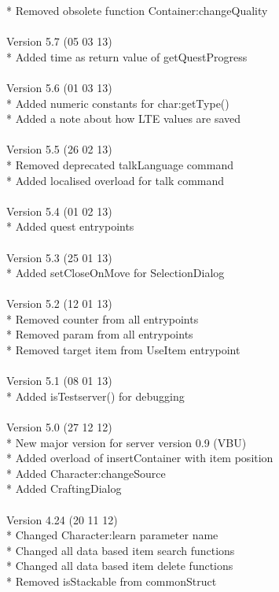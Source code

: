 \documentclass[a4paper,10pt,makeidx]{scrreprt}
\begin{document}
* Removed obsolete function Container:changeQuality\\
\\
Version 5.7 (05 03 13)\\
* Added time as return value of getQuestProgress\\
\\
Version 5.6 (01 03 13)\\
* Added numeric constants for char:getType()\\
* Added a note about how LTE values are saved\\
\\
Version 5.5 (26 02 13)\\
* Removed deprecated talkLanguage command\\
* Added localised overload for talk command\\
\\
Version 5.4 (01 02 13)\\
* Added quest entrypoints\\
\\
Version 5.3 (25 01 13)\\
* Added setCloseOnMove for SelectionDialog\\
\\
Version 5.2 (12 01 13)\\
* Removed counter from all entrypoints\\
* Removed param from all entrypoints\\
* Removed target item from UseItem entrypoint\\
\\
Version 5.1 (08 01 13)\\
* Added isTestserver() for debugging\\
\\
Version 5.0 (27 12 12)\\
* New major version for server version 0.9 (VBU)\\
* Added overload of insertContainer with item position\\
* Added Character:changeSource\\
* Added CraftingDialog\\
\\
Version 4.24 (20 11 12)\\
* Changed Character:learn parameter name\\
* Changed all data based item search functions\\
* Changed all data based item delete functions\\
* Removed isStackable from commonStruct\\
\end{document}
